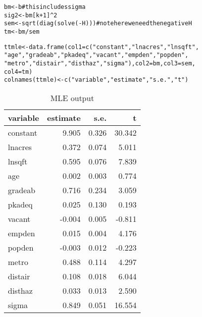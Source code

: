 \documentclass[11pt,reqno]{amsart}\usepackage[]{graphicx}\usepackage[]{color}
\makeatletter
\newcommand{\hlnum}[1]{\textcolor[rgb]{0.063,0.58,0.627}{#1}}%
\newcommand{\hlstr}[1]{\textcolor[rgb]{0.063,0.58,0.627}{#1}}%
\newcommand{\hlcom}[1]{\textcolor[rgb]{0.588,0.588,0.588}{#1}}%
\newcommand{\hlopt}[1]{\textcolor[rgb]{0.196,0.196,0.196}{#1}}%
\newcommand{\hlstd}[1]{\textcolor[rgb]{0.196,0.196,0.196}{#1}}%
\newcommand{\hlkwb}[1]{\textcolor[rgb]{0.627,0,0.314}{#1}}%
\newcommand{\hlkwc}[1]{\textcolor[rgb]{0,0.631,0.314}{#1}}%
\newcommand{\hlkwd}[1]{\textcolor[rgb]{0.78,0.227,0.412}{#1}}%
\newenvironment{kframe}{%
 \def\at@end@of@kframe{}%
 \ifinner\ifhmode%
  \def\at@end@of@kframe{\end{minipage}}%
  \begin{minipage}{\columnwidth}%
 \fi\fi%
 \def\FrameCommand##1{\hskip\@totalleftmargin \hskip-\fboxsep
 \colorbox{shadecolor}{##1}\hskip-\fboxsep
     \hskip-\linewidth \hskip-\@totalleftmargin \hskip\columnwidth}%
 \MakeFramed {\advance\hsize-\width
   \@totalleftmargin\z@ \linewidth\hsize
   \@setminipage}}%
 {\par\unskip\endMakeFramed%
 \at@end@of@kframe}
\newenvironment{knitrout}{}{} %
\makeatother
\begin{document}
\begin{knitrout}
\color{fgcolor}\begin{kframe}
\begin{alltt}
\hlstd{bm} \hlkwb{<-} \hlstd{b}  \hlcom{#this includes sigma}
\hlstd{sig2} \hlkwb{<-} \hlstd{bm[k} \hlopt{+} \hlnum{1}\hlstd{]}\hlopt{^}\hlnum{2}
\hlstd{sem} \hlkwb{<-} \hlkwd{sqrt}\hlstd{(}\hlkwd{diag}\hlstd{(}\hlkwd{solve}\hlstd{(}\hlopt{-}\hlstd{H)))}  \hlcom{#note here we need the negative H}
\hlstd{tm} \hlkwb{<-} \hlstd{bm}\hlopt{/}\hlstd{sem}

\hlstd{ttmle} \hlkwb{<-} \hlkwd{data.frame}\hlstd{(}\hlkwc{col1} \hlstd{=} \hlkwd{c}\hlstd{(}\hlstr{"constant"}\hlstd{,} \hlstr{"lnacres"}\hlstd{,} \hlstr{"lnsqft"}\hlstd{,}
    \hlstr{"age"}\hlstd{,} \hlstr{"gradeab"}\hlstd{,} \hlstr{"pkadeq"}\hlstd{,} \hlstr{"vacant"}\hlstd{,} \hlstr{"empden"}\hlstd{,} \hlstr{"popden"}\hlstd{,}
    \hlstr{"metro"}\hlstd{,} \hlstr{"distair"}\hlstd{,} \hlstr{"disthaz"}\hlstd{,} \hlstr{"sigma"}\hlstd{),} \hlkwc{col2} \hlstd{= bm,} \hlkwc{col3} \hlstd{= sem,}
    \hlkwc{col4} \hlstd{= tm)}
\hlkwd{colnames}\hlstd{(ttmle)} \hlkwb{<-} \hlkwd{c}\hlstd{(}\hlstr{"variable"}\hlstd{,} \hlstr{"estimate"}\hlstd{,} \hlstr{"s.e."}\hlstd{,} \hlstr{"t"}\hlstd{)}
\end{alltt}
\end{kframe}
\end{knitrout}

\begin{table}[!h]
\centering
\caption{MLE output} 
\begin{tabular}{lrrr}
  \hline
variable & estimate & s.e. & t \\ 
  \hline
constant & 9.905 & 0.326 & 30.342 \\ 
  lnacres & 0.372 & 0.074 & 5.011 \\ 
  lnsqft & 0.595 & 0.076 & 7.839 \\ 
  age & 0.002 & 0.003 & 0.774 \\ 
  gradeab & 0.716 & 0.234 & 3.059 \\ 
  pkadeq & 0.025 & 0.130 & 0.193 \\ 
  vacant & -0.004 & 0.005 & -0.811 \\ 
  empden & 0.015 & 0.004 & 4.176 \\ 
  popden & -0.003 & 0.012 & -0.223 \\ 
  metro & 0.488 & 0.114 & 4.297 \\ 
  distair & 0.108 & 0.018 & 6.044 \\ 
  disthaz & 0.033 & 0.013 & 2.590 \\ 
  sigma & 0.849 & 0.051 & 16.554 \\ 
   \hline
\end{tabular}
\end{table}
\end{document}

